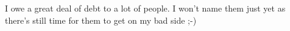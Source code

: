 I owe a great deal of debt to a lot of people. I won't name them just yet
as there's still time for them to get on my bad side ;-)
